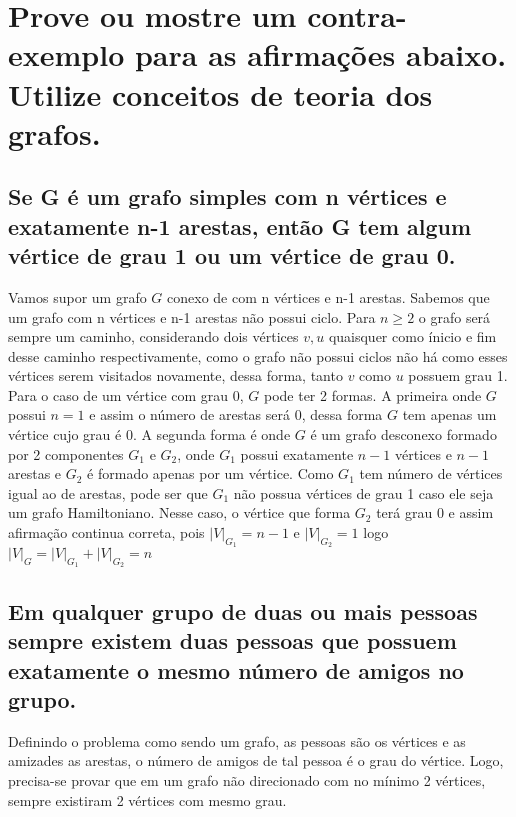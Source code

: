 \documentclass[12pt]{article}
\begin{document}

\section{Prove ou mostre um contra-exemplo para as afirmações abaixo. Utilize conceitos de
teoria dos grafos.}
\subsection{Se G é um grafo simples com n vértices e exatamente n-1 arestas, então G tem algum vértice de grau 1 ou um vértice de grau 0.}
 

Vamos supor um grafo $G$ conexo de com n vértices e n-1 arestas. Sabemos que um grafo com n vértices e n-1 arestas não possui ciclo. Para $n \geq 2$ o grafo será sempre um caminho, considerando dois vértices $v,u$ quaisquer como ínicio e fim desse caminho respectivamente, como o grafo não possui ciclos não há como esses vértices serem visitados novamente, dessa forma, tanto $v$ como $u$ possuem grau 1. \\

Para o caso de um vértice com grau 0, $G$ pode ter 2 formas. A primeira onde $G$ possui $n=1$ e assim o número de arestas será 0, dessa forma $G$ tem apenas um vértice cujo grau é 0. A segunda forma é onde $G$ é um grafo desconexo formado por 2 componentes $G_1$ e $G_2$, onde $G_1$ possui exatamente $n-1$ vértices e $n-1$ arestas e $G_2$ é formado apenas por um vértice. Como $G_1$ tem número de vértices igual ao de arestas, pode ser que $G_1$ não possua vértices de grau 1 caso ele seja um grafo Hamiltoniano. Nesse caso, o vértice que forma $G_2$ terá grau 0 e assim afirmação continua correta, pois $|V|_{G_1} = n - 1$ e $|V|_{G_2} = 1$ logo $|V|_G = |V|_{G_1} + |V|_{G_2} = n$

\subsection{Em qualquer grupo de duas ou mais pessoas sempre existem duas pessoas que possuem
exatamente o mesmo número de amigos no grupo.}

Definindo o problema como sendo um grafo, as pessoas são os vértices e as amizades as arestas, o número de amigos de tal pessoa é o grau do vértice. Logo, precisa-se provar que em um grafo não direcionado com no mínimo 2 vértices, sempre existiram 2 vértices com mesmo grau. \\
\end{document}
